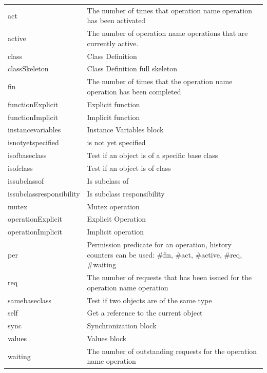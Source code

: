 \documentclass{overturerepchap}
\begin{document}
\begin{longtable}{| l| p{9cm}| }
act                       & The number of times that operation name operation has been activated\\
active                    & The number of operation name operations that are currently active.\\
class                     & Class Definition\\
classSkeleton             & Class Definition full skeleton\\
fin                       & The number of times that the operation name operation has been completed\\
functionExplicit          & Explicit function\\
functionImplicit          & Implicit function\\
instancevariables         & Instance Variables block\\
isnotyetspecified         & is not yet specified\\
isofbaseclass             & Test if an object is of a specific base class\\
isofclass                 & Test if an object is of class\\
issubclassof              & Is subclass of\\
issubclassresponsibility  & Is subclass responsibility\\
mutex                     & Mutex operation\\
operationExplicit         & Explicit Operation\\
operationImplicit         & Implicit operation\\
per                       & Permission predicate for an operation, history counters can be used: \#fin, \#act, \#active, \#req, \#waiting\\
req                       & The number of requests that has been issued for the operation name operation\\
samebaseclass             & Test if two objects are of the same type\\
self                      & Get a reference to the current object\\
sync                      & Synchronization block\\
values                    & Values block\\
waiting                   & The number of outstanding requests for the operation name operation\\


\end{longtable}
\end{document}

